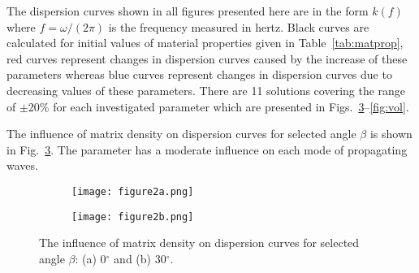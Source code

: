\documentclass[preprint,12pt]{elsarticle}
\begin{document}
 The dispersion curves shown in all figures presented here are in the form \(k(f)\) where 
 \(f=\omega/(2 \pi)\) is the frequency measured in hertz. Black curves are calculated for 
 initial values of material properties given in Table~\ref{tab:matprop}, red curves 
 represent changes in dispersion curves caused by the increase of these parameters 
 whereas blue curves represent changes in dispersion curves due to decreasing values 
 of these parameters. There are 11 solutions covering the range of \(\pm\)20\% for each 
 investigated parameter which are presented in Figs.~\ref{fig:rhom}--\ref{fig:vol}.
 
 The influence of matrix density on dispersion curves for selected angle \(\beta\) is 
 shown in Fig.~\ref{fig:rhom}. The parameter has a moderate influence on each mode of 
 propagating waves.
 
 \begin{figure} [h!]
 	\centering
 	\begin{subfigure}[b]{0.49\textwidth}
 		\centering
 		\texttt{[image: figure2a.png]}
 		\caption{}
 		\label{fig:rhom0}
 	\end{subfigure}
 	\hfill
 	\begin{subfigure}[b]{0.49\textwidth}
 		\centering
 		\texttt{[image: figure2b.png]}
 		\caption{}
 		\label{fig:rhom30}
 	\end{subfigure}
 	\caption{The influence of matrix density on dispersion curves for selected angle 
 	\(\beta\): (a) 0\(^{\circ}\) and (b) 30\(^{\circ}\).} 
 	\label{fig:rhom}
 \end{figure}
\clearpage
\end{document}
